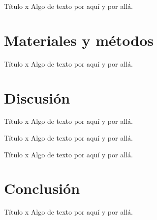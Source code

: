 \documentclass{beamer}
\begin{document}
\begin{frame}{Título x}
	Algo de texto por aquí y por allá.
\end{frame}


\section{Materiales y métodos}

\begin{frame}{Título x}
	Algo de texto por aquí y por allá.
\end{frame}


\section{Discusión}

\begin{frame}{Título x}
	Algo de texto por aquí y por allá.
\end{frame}

\begin{frame}{Título x}
	Algo de texto por aquí y por allá.
\end{frame}

\begin{frame}{Título x}
	Algo de texto por aquí y por allá.
\end{frame}


\section{Conclusión}

\begin{frame}{Título x}
	Algo de texto por aquí y por allá.
\end{frame}

\end{document}
